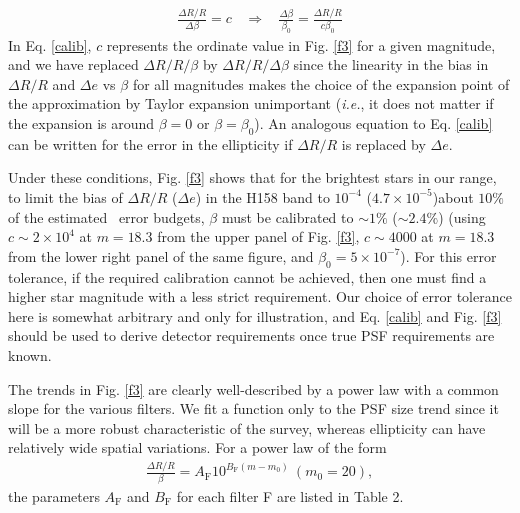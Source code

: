 \documentclass[preprint]{aastex}
\begin{document}
\begin{align}
\frac{\Delta R/R}{\Delta \beta} = c \ \ \ \  \Rightarrow \ \ \ \ %
\frac{\Delta \beta}{\beta_0} = \frac{\Delta R/R}{c \beta_0}
\label{calib}
\end{align}
In Eq. \ref{calib}, $c$ represents the ordinate value in Fig. \ref{f3} for a given magnitude, and we have replaced $\Delta R/R/\beta$ by $\Delta R/R/ \Delta \beta$ since the linearity in the bias in $\Delta R/R$ and $\Delta e$ vs $\beta$ for all magnitudes makes the choice of the expansion point of the approximation by Taylor expansion unimportant (\emph{i.e.}, it does not matter if the expansion is around $\beta=0$ or $\beta=\beta_0$). An analogous equation to Eq. \ref{calib} can be written for the error in the ellipticity if $\Delta R/R$ is replaced by $\Delta e$. 

Under these conditions, Fig. \ref{f3} shows that for the brightest stars in our range, to limit the bias of $\Delta R/R$ ($\Delta e$) in the H158 band to $10^{-4}$  ($4.7\times 10^{-5}$)\textemdash about $10\%$ of the estimated \wf\ error budgets, $\beta$ must be calibrated to $\sim1\%$ ($\sim 2.4\%$) (using $c\sim2\times10^4$ at $m=18.3$ from the upper panel of Fig. \ref{f3}, $c\sim4000$ at $m=18.3$ from the lower right panel of the same figure, and $\beta_0=5\times10^{-7}$). For this error tolerance, if the required calibration cannot be achieved, then one must find a higher star magnitude with a less strict requirement.  Our choice of error tolerance here is somewhat arbitrary and only for illustration, and Eq. \ref{calib} and Fig. \ref{f3} should be used to derive detector requirements once true PSF requirements are known.

The trends in Fig. \ref{f3} are clearly well-described by a power law with a common slope for the various filters.  We fit a function only to the PSF size trend since it will be a more robust characteristic of the  survey, whereas ellipticity can have relatively wide spatial variations.  For a power law of the form
\begin{align}
\frac{\Delta R/ R}{\beta} = A_{\text{F}} 10^{B_{\text{F}} (m - m_{0})} \ (m_0 =20), 
\label{power_law}
\end{align}
the parameters $A_{\text{F}}$ and $B_{\text{F}}$ for each filter F are listed in Table 2. 
\end{document}
